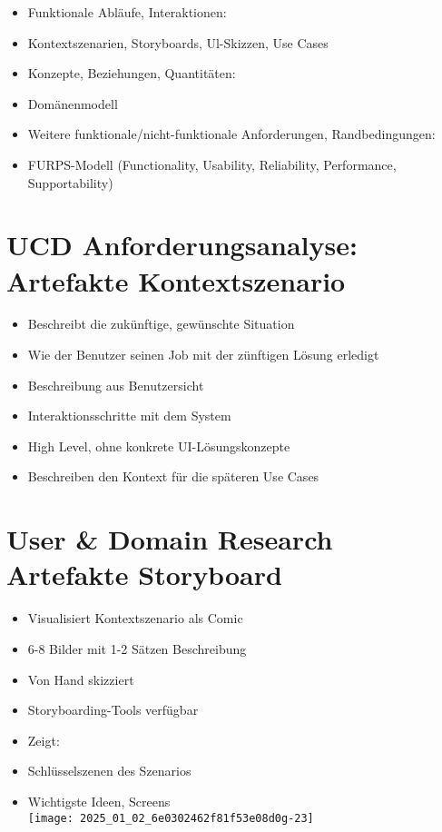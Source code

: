 \documentclass[10pt]{article}
\begin{document}
\begin{itemize}
  \item Funktionale Abläufe, Interaktionen:
  \item Kontextszenarien, Storyboards, Ul-Skizzen, Use Cases
  \item Konzepte, Beziehungen, Quantitäten:
  \item Domänenmodell
  \item Weitere funktionale/nicht-funktionale Anforderungen, Randbedingungen:
  \item FURPS-Modell (Functionality, Usability, Reliability, Performance, Supportability)
\end{itemize}

\section*{UCD Anforderungsanalyse: Artefakte Kontextszenario}
\begin{itemize}
  \item Beschreibt die zukünftige, gewünschte Situation
  \item Wie der Benutzer seinen Job mit der zünftigen Lösung erledigt
  \item Beschreibung aus Benutzersicht
  \item Interaktionsschritte mit dem System
  \item High Level, ohne konkrete UI-Lösungskonzepte
  \item Beschreiben den Kontext für die späteren Use Cases
\end{itemize}

\section*{User \& Domain Research Artefakte Storyboard}
\begin{itemize}
  \item Visualisiert Kontextszenario als Comic
  \item 6-8 Bilder mit 1-2 Sätzen Beschreibung
  \item Von Hand skizziert
  \item Storyboarding-Tools verfügbar
  \item Zeigt:
  \item Schlüsselszenen des Szenarios
  \item Wichtigste Ideen, Screens\\
\texttt{[image: 2025\_01\_02\_6e0302462f81f53e08d0g-23]}
\end{itemize}
\end{document}
